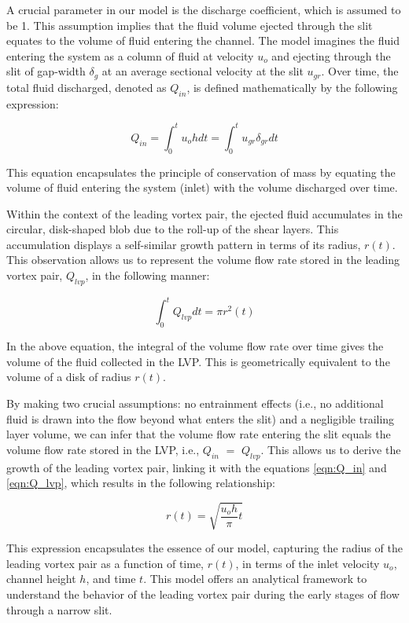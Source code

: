 \documentclass[final,3p,times,authoryear]{elsarticle}
\begin{document}
A crucial parameter in our model is the discharge coefficient, which is assumed to be 1. This assumption implies that the fluid volume ejected through the slit equates to the volume of fluid entering the channel. The model imagines the fluid entering the system as a column of fluid at velocity $u_o$ and ejecting through the slit of gap-width $\delta_g$ at an average sectional velocity at the slit $u_{gr}$. Over time, the total fluid discharged, denoted as $Q_{in}$, is defined mathematically by the following expression:

\begin{equation}
	Q_{in}=\int_{0}^{t}u_o hdt = \int_{0}^{t}u_{gr} \delta_{gr}dt
	\label{eqn:Q_in}
\end{equation}

This equation encapsulates the principle of conservation of mass by equating the volume of fluid entering the system (inlet) with the volume discharged over time.

Within the context of the leading vortex pair, the ejected fluid accumulates in the circular, disk-shaped blob due to the roll-up of the shear layers. This accumulation displays a self-similar growth pattern in terms of its radius, $r(t)$. This observation allows us to represent the volume flow rate stored in the leading vortex pair, $Q_{lvp}$, in the following manner:

\begin{equation}
	\int_{0}^{t}Q_{lvp}dt= \pi r^2(t)
	\label{eqn:Q_lvp}
\end{equation}

In the above equation, the integral of the volume flow rate over time gives the volume of the fluid collected in the LVP. This is geometrically equivalent to the volume of a disk of radius $r(t)$.

By making two crucial assumptions: no entrainment effects (i.e., no additional fluid is drawn into the flow beyond what enters the slit) and a negligible trailing layer volume, we can infer that the volume flow rate entering the slit equals the volume flow rate stored in the LVP, i.e., $Q_{in}$ $=$ $Q_{lvp}$. This allows us to derive the growth of the leading vortex pair, linking it with the equations \ref{eqn:Q_in} and \ref{eqn:Q_lvp}, which results in the following relationship:

\begin{equation}
	r(t) = \sqrt{\frac{u_o h}{\pi}t}
	\label{eqn:r_lvp}
\end{equation}

This expression encapsulates the essence of our model, capturing the radius of the leading vortex pair as a function of time, $r(t)$, in terms of the inlet velocity $u_o$, channel height $h$, and time $t$. This model offers an analytical framework to understand the behavior of the leading vortex pair during the early stages of flow through a narrow slit. 
\end{document}
